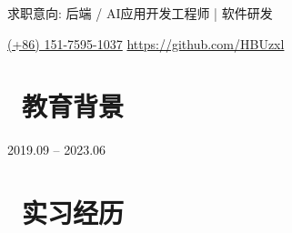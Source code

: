 \documentclass{resume}
\begin{document}


\centerline{求职意向: 后端 / AI应用开发工程师 | 软件研发}
\vspace{1ex}
    {\href{tel:+8615175951037}{(+86) 151-7595-1037}}
    {\url{https://github.com/HBUzxl} 
}

 
\section{\faGraduationCap\  教育背景}
 {2019.09 -- 2023.06}

\vspace{1ex}


\section{\faUsers\ 实习经历}
\end{document}
